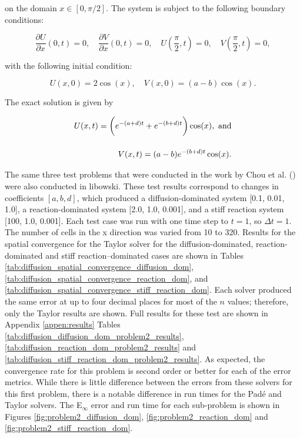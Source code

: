 \noindent on the domain $x \in [0, \pi/2]$. The system is subject to the following boundary conditions: 

\begin{equation}
    \frac{\partial U}{\partial x}(0,t) = 0, \quad \frac{\partial V}{\partial x}(0,t) = 0, \quad U(\frac{\pi}{2}, t) = 0, \quad V(\frac{\pi}{2}, t)= 0,
\end{equation}

\noindent with the following initial condition:

\begin{equation}
    U(x,0) = 2\cos(x), \quad V(x,0) = (a-b)\cos(x).
\end{equation}

\noindent The exact solution is given by

\begin{equation}
\setlength{\jot}{15pt}
\begin{split}
    U(x,t) = \bigg( e^{-(a+d)t} + e^{-(b+d)t}\bigg)\cos(x), \text{ and} \\
    V(x,t) = (a - b) e^{-(b+d)t}\cos(x).
\end{split}
\end{equation}

The same three test problems that were conducted in the work by Chou et al. (\cite{ching2007}) were also conducted in libowski. These test results correspond to changes in coefficients $[a, b, d]$, which produced a diffusion-dominated system [0.1, 0.01, 1.0], a reaction-dominated system [2.0, 1.0, 0.001], and a stiff reaction system [100, 1.0, 0.001]. Each test case was run with one time step to $t = 1$, so $\Delta t = 1$. The number of cells in the x direction was varied from 10 to 320. Results for the spatial convergence for the Taylor solver for the diffusion-dominated, reaction-dominated and stiff reaction--dominated cases are shown in Tables \ref{tab:diffusion_spatial_convergence_diffusion_dom}, \ref{tab:diffusion_spatial_convergence_reaction_dom}, and \ref{tab:diffusion_spatial_convergence_stiff_reaction_dom}. Each solver produced the same error at up to four decimal places for most of the $n$ values; therefore, only the Taylor results are shown. Full results for these test are shown in Appendix \ref{appen:results} Tables \ref{tab:diffusion_diffusion_dom_problem2_results}, \ref{tab:diffusion_reaction_dom_problem2_results} and \ref{tab:diffusion_stiff_reaction_dom_problem2_results}. As expected, the convergence rate for this problem is second order or better for each of the error metrics.  While there is little difference between the errors from these solvers for this first problem, there is a notable difference in run times for the Pad\'e and Taylor solvers. The E${}_{\infty}$ error and run time for each sub-problem is shown in Figures \ref{fig:problem2_diffusion_dom}, \ref{fig:problem2_reaction_dom} and \ref{fig:problem2_stiff_reaction_dom}. 

